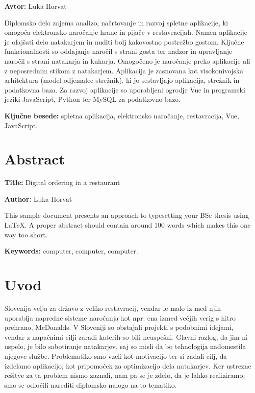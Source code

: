 \documentclass[a4paper, 12pt]{book}
\newcommand{\ttitleEn}{Digital ordering in a restaurant}
\newcommand{\tauthor}{Luka Horvat}
\newcommand{\tkeywords}{spletna aplikacija, elektronsko naročanje, restavracija, Vue, JavaScript}
\newcommand{\tkeywordsEn}{computer, computer, computer}
\newcommand{\clearemptydoublepage}{\newpage{\pagestyle{empty}\cleardoublepage}}
\begin{document}
\noindent\textbf{Avtor:} \tauthor
\bigskip


\noindent 
Diplomsko delo zajema analizo, načrtovanje in razvoj spletne aplikacije, ki omogoča elektronsko naročanje hrane in pijače v restavracijah. Namen aplikacije je olajšati delo natakarjem in nuditi bolj kakovostno postrežbo gostom. Ključne funkcionalnosti so oddajanje naročil s strani gosta ter nadzor in upravljanje naročil s strani natakarja in kuharja. Omogočeno je naročanje preko aplikacije ali z neposrednim stikom z natakarjem. Aplikacija je zasnovana kot visokonivojska arhitektura (model odjemalec-strežnik), ki jo sestavljajo aplikacija, strežnik in podatkovna baza. Za razvoj aplikacije so uporabljeni ogrodje Vue in programski jeziki JavaScript, Python ter MySQL za podatkovno bazo.
\bigskip

\noindent\textbf{Ključne besede:} \tkeywords.
\clearemptydoublepage

\chapter*{Abstract}

\noindent\textbf{Title:} \ttitleEn
\bigskip

\noindent\textbf{Author:} \tauthor
\bigskip

\noindent This sample document presents an approach to typesetting your BSc thesis using \LaTeX. 
A proper abstract should contain around 100 words which makes this one way too short.
\bigskip

\noindent\textbf{Keywords:} \tkeywordsEn.
\clearemptydoublepage

\mainmatter
\setcounter{page}{1}
\pagestyle{fancy}
 
\chapter{Uvod}
Slovenija velja za državo z veliko restavracij, vendar le malo iz med njih uporablja napredne sisteme naročanja kot npr. ena izmed večjih verig s hitro prehrano, McDonalds. V Sloveniji so obstajali projekti s podobnimi idejami, vendar z napačnimi cilji zaradi katerih so bili neuspešni. Glavni razlog, da jim ni uspelo, je bilo sabotiranje natakarjev, saj so misli da bo tehnologija nadomestila njegove službe. Problematiko smo vzeli kot motivacijo ter si zadali cilj, da izdelamo aplikacijo, kot pripomoček za optimizacijo dela natakarjev. Ker ustrezne rešitve za ta problem nismo zaznali, nam pa se je zdelo, da je lahko realiziramo, smo se odločili narediti diplomsko nalogo na to tematiko.
\end{document}
